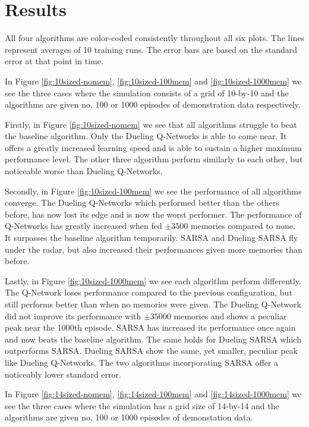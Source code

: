 
\section{Results}
All four algorithms are color-coded consistently throughout all six plots. The lines represent averages of 10 training runs. The error bars are based on the standard error at that point in time.

In Figure \ref{fig:10sized-nomem}, \ref{fig:10sized-100mem} and \ref{fig:10sized-1000mem} we see the three cases where the simulation consists of a grid of 10-by-10 and the algorithms are given no, 100 or 1000 episodes of demonstration data respectively.

Firstly, in Figure \ref{fig:10sized-nomem} we see that all algorithms struggle to beat the baseline algorithm. Only the Dueling Q-Networks is able to come near. It offers a greatly increased learning speed and is able to sustain a higher maximum performance level. The other three algorithm perform similarly to each other, but noticeable worse than Dueling Q-Networks.

Secondly, in Figure \ref{fig:10sized-100mem} we see the performance of all algorithms converge. The Dueling Q-Networks which performed better than the others before, has now lost its edge and is now the worst performer. The performance of Q-Networks has greatly increased when fed $\pm 3500$ memories compared to none. It surpasses the baseline algorithm temporarily. SARSA and Dueling SARSA fly under the radar, but also increased their performances given more memories than before.

Lastly, in Figure \ref{fig:10sized-1000mem} we see each algorithm perform differently. The Q-Network loses performance compared to the previous configuration, but still performs better than when no memories were given. The Dueling Q-Network did not improve its performance with $\pm 35000$ memories and shows a peculiar peak near the 1000th episode. SARSA has increased its performance once again and now beats the baseline algorithm. The same holds for Dueling SARSA which outperforms SARSA. Dueling SARSA show the same, yet smaller, peculiar peak like Dueling Q-Networks. The two algorithms incorporating SARSA offer a noticeably lower standard error.

In Figure \ref{fig:14sized-nomem}, \ref{fig:14sized-100mem} and \ref{fig:14sized-1000mem} we see the three cases where the simulation has a grid size of 14-by-14 and the algorithms are given no, 100 or 1000 episodes of demonstation data.


